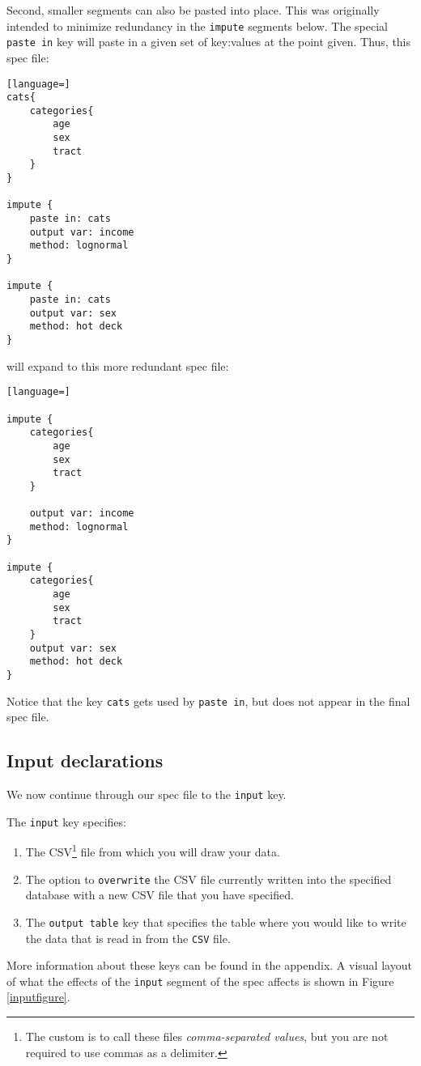 \documentclass{article}
\begin{document}
Second, smaller segments can also be pasted into place. This was originally intended to
minimize redundancy in the {\tt impute} segments below. The special {\tt paste in} key
will paste in a given set of key:values at the point given. Thus, this spec file:

\begin{lstlisting}[language=]
cats{
    categories{
        age
        sex
        tract
    }
}

impute {
    paste in: cats
    output var: income
    method: lognormal
}

impute {
    paste in: cats
    output var: sex
    method: hot deck
}
\end{lstlisting}

will expand to this more redundant spec file:

\begin{lstlisting}[language=]

impute {
    categories{
        age
        sex
        tract
    }

    output var: income
    method: lognormal
}

impute {
    categories{
        age
        sex
        tract
    }
    output var: sex
    method: hot deck
}
\end{lstlisting}

Notice that the key {\tt cats} gets used by {\tt paste in}, but does not appear in
the final spec file.


\subsection{Input declarations}
We now continue through our spec file to the {\tt input} key.

The {\tt input} key specifies:
\begin{enumerate}
\item The  CSV\footnote{The custom is to call these files {\em
    comma-separated values}, but you are not required to use commas as a delimiter.}
    file from which you will draw your data.
\item The option to \texttt{overwrite} the CSV file currently written into the specified database with 
a new CSV file that you have specified.
\item The {\tt output table} key that specifies the table where you would like to 
write the data that is read in from the {\tt CSV} file.
\end{enumerate}

More information about these keys can be found in the appendix.  A visual layout of
what the effects of the {\tt input} segment of the spec affects is shown in Figure
\ref{inputfigure}.
\end{document}
